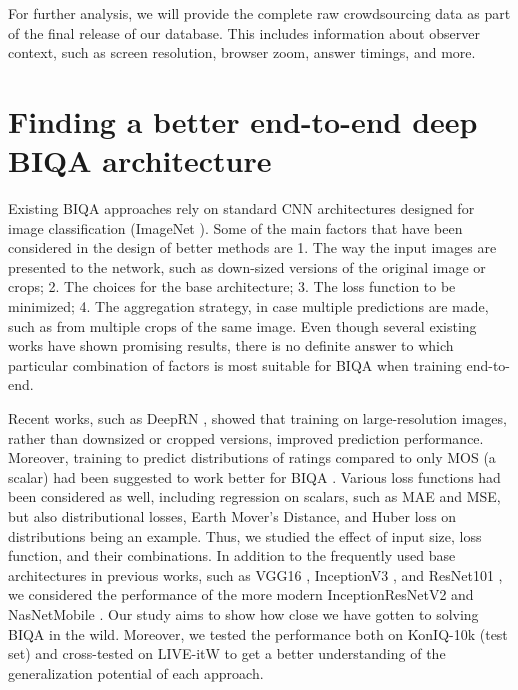 \documentclass[10pt,journal,compsoc]{IEEEtran}
\begin{document}
For further analysis, we will provide the complete raw crowdsourcing data as part of the final release of our database. This includes information about observer context, such as screen resolution, browser zoom, answer timings, and more.










\section{Finding a better end-to-end deep BIQA architecture}


Existing BIQA approaches rely on standard CNN architectures designed for image classification (ImageNet \cite{deng2009imagenet}). Some of the main factors that have been considered in the design of better methods are 1. The way the input images are presented to the network, such as down-sized versions of the original image or crops; 2. The choices for the base architecture; 3. The loss function to be minimized; 4. The aggregation strategy, in case multiple predictions are made, such as from multiple crops of the same image. Even though several existing works have shown promising results, there is no definite answer to which particular combination of factors is most suitable for BIQA when training end-to-end.

Recent works, such as DeepRN \cite{varga2018deeprn}, showed that training on large-resolution images, rather than downsized or cropped versions, improved prediction performance. Moreover, training to predict distributions of ratings compared to only MOS (a scalar) had been suggested to work better for BIQA \cite{talebi_nima_2017,varga2018deeprn}. Various loss functions had been considered as well, including regression on scalars, such as MAE and MSE, but also distributional losses, Earth Mover's Distance, and Huber loss on distributions being an example. Thus, we studied the effect of input size, loss function, and their combinations. In addition to the frequently used base architectures in previous works, such as VGG16 \cite{vgg}, InceptionV3 \cite{szegedy2017inception}, and ResNet101 \cite{he2016deep}, we considered the performance of the more modern InceptionResNetV2 \cite{szegedy2016rethinking} and NasNetMobile \cite{zoph2017learning}. Our study aims to show how close we have gotten to solving BIQA in the wild. Moreover, we tested the performance both on KonIQ-10k (test set) and cross-tested on LIVE-itW to get a better understanding of the generalization potential of each approach. 
\end{document}
